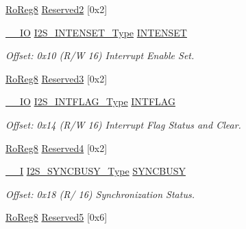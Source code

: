\begin{DoxyCompactItemize}
\mbox{\hyperlink{group___s_a_m_d21_e15_a__definitions_ga0d957f1433aaf5d70e4dc2b68288442d}{Ro\+Reg8}} \mbox{\hyperlink{struct_i2s_a39c013121a741bab8d9442a891da19a7}{Reserved2}} \mbox{[}0x2\mbox{]}
\item 
\mbox{\hyperlink{core__cm0plus_8h_aec43007d9998a0a0e01faede4133d6be}{\+\_\+\+\_\+\+IO}} \mbox{\hyperlink{union_i2_s___i_n_t_e_n_s_e_t___type}{I2\+S\+\_\+\+I\+N\+T\+E\+N\+S\+E\+T\+\_\+\+Type}} \mbox{\hyperlink{struct_i2s_a9a8942c1f47510e4f02c5ce67a9a7cd2}{I\+N\+T\+E\+N\+S\+ET}}
\begin{DoxyCompactList}\small\item\em Offset\+: 0x10 (R/W 16) Interrupt Enable Set. \end{DoxyCompactList}\item 
\mbox{\hyperlink{group___s_a_m_d21_e15_a__definitions_ga0d957f1433aaf5d70e4dc2b68288442d}{Ro\+Reg8}} \mbox{\hyperlink{struct_i2s_ad07c4ef2ff7a794403c53387495e8d6d}{Reserved3}} \mbox{[}0x2\mbox{]}
\item 
\mbox{\hyperlink{core__cm0plus_8h_aec43007d9998a0a0e01faede4133d6be}{\+\_\+\+\_\+\+IO}} \mbox{\hyperlink{union_i2_s___i_n_t_f_l_a_g___type}{I2\+S\+\_\+\+I\+N\+T\+F\+L\+A\+G\+\_\+\+Type}} \mbox{\hyperlink{struct_i2s_aca78dfc860812144e72e270a7d59711d}{I\+N\+T\+F\+L\+AG}}
\begin{DoxyCompactList}\small\item\em Offset\+: 0x14 (R/W 16) Interrupt Flag Status and Clear. \end{DoxyCompactList}\item 
\mbox{\hyperlink{group___s_a_m_d21_e15_a__definitions_ga0d957f1433aaf5d70e4dc2b68288442d}{Ro\+Reg8}} \mbox{\hyperlink{struct_i2s_aec3221203f6f367a8473128fc2f5429e}{Reserved4}} \mbox{[}0x2\mbox{]}
\item 
\mbox{\hyperlink{core__cm0plus_8h_af63697ed9952cc71e1225efe205f6cd3}{\+\_\+\+\_\+I}} \mbox{\hyperlink{union_i2_s___s_y_n_c_b_u_s_y___type}{I2\+S\+\_\+\+S\+Y\+N\+C\+B\+U\+S\+Y\+\_\+\+Type}} \mbox{\hyperlink{struct_i2s_a1d9f6b5b2c5834e95df7ab5fd89b5059}{S\+Y\+N\+C\+B\+U\+SY}}
\begin{DoxyCompactList}\small\item\em Offset\+: 0x18 (R/ 16) Synchronization Status. \end{DoxyCompactList}\item 
\mbox{\hyperlink{group___s_a_m_d21_e15_a__definitions_ga0d957f1433aaf5d70e4dc2b68288442d}{Ro\+Reg8}} \mbox{\hyperlink{struct_i2s_a100f86a70e5c7d2c1cdf836d1836e248}{Reserved5}} \mbox{[}0x6\mbox{]}
\item 

\end{DoxyCompactItemize}
